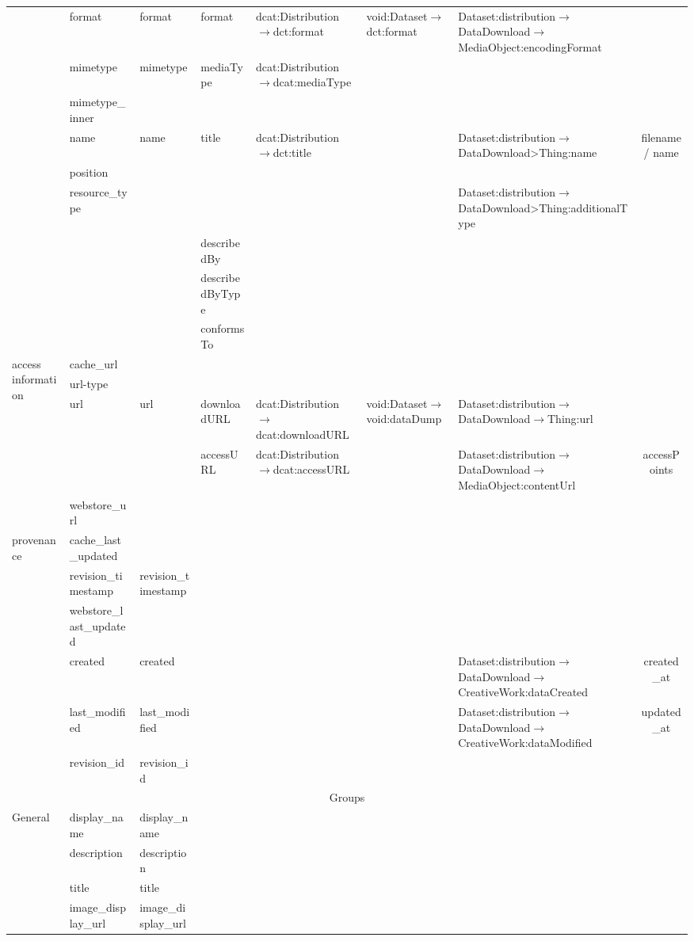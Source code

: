 \documentclass[runningheads,a4paper]{llncs}
\begin{document}
{\begin{longtable}{|p{1.5cm}|l|l|l|p{3cm}|m{3cm}|m{3cm}|c|}
\cline{2-8}
 & format & format & format & dcat:Distribution$\rightarrow$dct:format & void:Dataset$\rightarrow$dct:format & Dataset:distribution$\rightarrow$DataDownload$\rightarrow$MediaObject:encodingFormat & \tabularnewline
\cline{2-8}
 & mimetype & mimetype & mediaType & dcat:Distribution$\rightarrow$dcat:mediaType &  &  & \tabularnewline
\cline{2-8}
 & mimetype\_inner &  &  &  &  &  & \tabularnewline
\cline{2-8}
 & name & name & title & dcat:Distribution$\rightarrow$dct:title &  & Dataset:distribution$\rightarrow$DataDownload>Thing:name & filename / name\tabularnewline
\cline{2-8}
 & position &  &  &  &  &  & \tabularnewline
\cline{2-8}
 & resource\_type &  &  &  &  & Dataset:distribution$\rightarrow$DataDownload>Thing:additionalType & \tabularnewline
\cline{2-8}
 &  &  & describedBy &  &  &  & \tabularnewline
\cline{2-8}
 &  &  & describedByType &  &  &  & \tabularnewline
\cline{2-8}
 &  &  & conformsTo &  &  &  & \tabularnewline
\hline
\hline
\multirow{5}{2cm}{access information} & cache\_url &  &  &  &  &  & \tabularnewline
\cline{2-8}
 & url-type &  &  &  &  &  & \tabularnewline
\cline{2-8}
 & url & url & downloadURL & dcat:Distribution$\rightarrow$dcat:downloadURL & void:Dataset$\rightarrow$void:dataDump & Dataset:distribution$\rightarrow$DataDownload$\rightarrow$Thing:url & \tabularnewline
\cline{2-8}
 &  &  & accessURL & dcat:Distribution$\rightarrow$dcat:accessURL &  & Dataset:distribution$\rightarrow$DataDownload$\rightarrow$MediaObject:contentUrl & accessPoints\tabularnewline
\cline{2-8}
 & webstore\_url &  &  &  &  &  & \tabularnewline
\hline
\hline
\multirow{6}{2cm}{provenance} & cache\_last\_updated &  &  &  &  &  & \tabularnewline
\cline{2-8}
 & revision\_timestamp & revision\_timestamp &  &  &  &  & \tabularnewline
\cline{2-8}
 & webstore\_last\_updated &  &  &  &  &  & \tabularnewline
\cline{2-8}
 & created & created &  &  &  & Dataset:distribution$\rightarrow$DataDownload$\rightarrow$CreativeWork:dataCreated & created\_at\tabularnewline
\cline{2-8}
 & last\_modified & last\_modified &  &  &  & Dataset:distribution$\rightarrow$DataDownload$\rightarrow$CreativeWork:dataModified & updated\_at\tabularnewline
\cline{2-8}
 & revision\_id & revision\_id &  &  &  &  & \tabularnewline
\hline
\hline
\multicolumn{8}{|c|}{Groups}\tabularnewline
\hline
\hline
\multirow{7}{2cm}{General} & display\_name & display\_name &  &  &  &  & \tabularnewline
\cline{2-8}
 & description & description &  &  &  &  & \tabularnewline
\cline{2-8}
 & title & title &  &  &  &  & \tabularnewline
\cline{2-8}
 & image\_display\_url & image\_display\_url &  &  &  &  & \tabularnewline

\end{longtable}}
\end{document}
